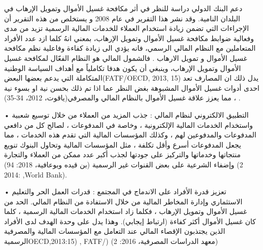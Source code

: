 \documentclass[10pt,a4paper]{report}
\begin{document}
\begin{doublespacing}
دعم البنك الدولي دراسة للنظر في أثر مكافحة غسيل الأموال وتمويل الإرهاب في البلدان النامية. وقد نشر هذا التقرير في عام 2008 و يستخلص من هذه التقرير أن الإجراءات التي تضمن زيادة استخدام العملاء للخدمات المالية الرسمية تزيد من مدى وفعالية ضوابط مكافحة غسيل الأموال وتمويل الإرهاب، بمعني انهُ  كلما ازد عدد الأفراد المتعاملين مع النظام المالي الرسمي، فانه يؤدي الى زيادة كفاءة وفاعلية نظم مكافحة غسيل الأموال و تمويل الارهاب . فالشمول المالي هو النظام الفعّال لمكافحة غسيل الأموال وتمويل الإرهاب، وينبغي أن يكون هدفا تكاملياً مع أهداف السياسة الوطنية المتكاملة التي يدعم بعضها البعض(FATF/OECD, 2013, 15) يدل ذلك ان المصارف تعد احدى أدوات غسيل الأموال المشبوهة بغض النظر عما اذا تم ذلك بحسن نية او بسوء نية ، مما يعزز علاقة غسيل الأموال بالنظام المالي والمصرفي(ياقوت، 2012، 34-35) .

•	التطبيق الالكتروني لنظام المالي : 
جذب المزيد من العملاء من خلال توسيع شعبية واستخدام الخدمات المالية الإلكترونية ، وخاصة في المدفوعات ، لصالح كل من دافعي المدفوعات والمدفوعين لهم ، وكذلك المؤسسات المالية التي تقدم هذه الخدمات ، مما يجعل المدفوعات أسرع وأقل تكلفة ، مثل المؤسسات المالية وتحاول البنوك تنويع منتجاتها وخدماتها والتركيز على جودتها لجذب أكبر عدد ممكن من العملاء والتجارة وإضفاء الشرعية على بعض القنوات غير الرسمية (بن قيده وبوعافية، 2018: 94) (2 :2014 ,World Bank).

•	تعزيز قدرة الأفراد على الاندماج في المجتمع :
قدرات العمل الحر والتعليم الاستثماري وإدارة المخاطر المالية من خلال الاستفادة من النظام المالي. الحد من غسيل الأموال وتمويل الإرهاب ، فكلما زاد استخدام الخدمات المالية الرسمية ، كلما كان غسيل الأموال أكثر كفاءة (ارتباط إيجابي). وهذا يدل على وحدة الهدف لدى الأفراد الذين يجتذبون الإقصاء المالي عند التعامل مع المؤسسات المالية والمصرفية الرسميةOECD,2013:15) , FATF/) (معهد الدراسات المصرفية، 2016: 2)

\end{doublespacing}
\end{document}
